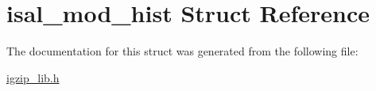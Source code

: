 \hypertarget{structisal__mod__hist}{\section{isal\-\_\-mod\-\_\-hist Struct Reference}
\label{structisal__mod__hist}
}


The documentation for this struct was generated from the following file\-:\begin{DoxyCompactItemize}
\item 
\hyperlink{igzip__lib_8h}{igzip\-\_\-lib.\-h}\end{DoxyCompactItemize}
